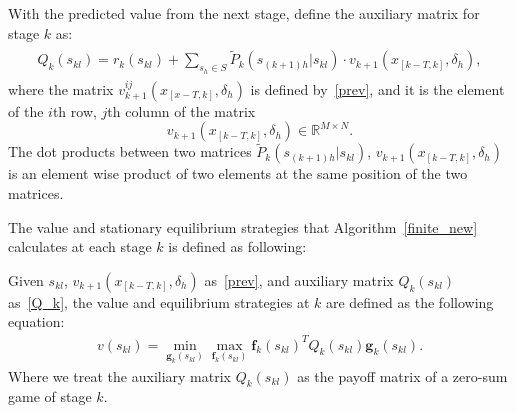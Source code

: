 With the predicted value from the next stage, define the auxiliary matrix for stage $k$ as:
\footnotesize
\begin{align}
\begin{split}
Q_{k}(s_{kl})=r_{k}(s_{kl})
                         +\sum_{s_h\in S} \tilde{P}_{k}( s_{(k+1)h} |s_{kl})\cdot v_{k+1}(x_{[k-T,k]},\delta_h),
\end{split}
\label{Q_k}
\end{align}
\normalsize
where the matrix $v^{ij}_{k+1}(x_{[x-T,k]},\delta_h)$ is defined by~\eqref{prev}, and it is the element of the $i$th row, $j$th column of the matrix $$v_{k+1}(x_{[k-T,k]},\delta_h) \in \mathbb{R}^{M \times N}.$$ %
The dot products between two matrices $\tilde{P}_{k}( s_{(k+1)h} |s_{kl})$, $v_{k+1}(x_{[k-T,k]},\delta_h)$ is an element wise product of two elements at the same position of the two matrices.
\iffalse we first predict the payoff matrix of stage $k+1$ for every action pair $(a_{ik}, u_{jk})$, which is denoted as $r_{k+1}(\mathbf{x}_{[k-T,k]},a_{ik},u_{jk},\delta_h), h=1,2,3$. For getting a payoff matrix at state $s_{kl}$, \fi

The value and stationary equilibrium strategies that Algorithm~\ref{finite_new} calculates at each stage $k$ is defined as following:
\begin{definition}
Given $s_{kl}$, $v_{k+1}(x_{[k-T,k]},\delta_h)$ as~\eqref{prev}, and auxiliary matrix $Q_{k}(s_{kl})$ as~\eqref{Q_k}, the value and equilibrium strategies at $k$ are defined as the following equation: 
\begin{align}
v(s_{kl})= \min\limits_{\mathbf{g}_k(s_{kl})}\max\limits_{\mathbf{f}_k(s_{kl})} \mathbf{f}_k(s_{kl})^T Q_{k}(s_{kl}) \mathbf{g}_k(s_{kl}).
\label{v_k}
\end{align}
Where we treat the auxiliary matrix $Q_{k}(s_{kl})$ as the payoff matrix of a zero-sum game of stage $k$. 
\end{definition}

